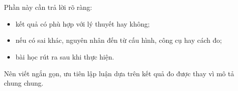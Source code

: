 \section{\sectiondiscussiontitle}
Phần này cần trả lời rõ ràng:
\begin{itemize}[leftmargin=2em]
    \item kết quả có phù hợp với lý thuyết hay không;
    \item nếu có sai khác, nguyên nhân đến từ cấu hình, công cụ hay cách đo;
    \item bài học rút ra sau khi thực hiện.
\end{itemize}

Nên viết ngắn gọn, ưu tiên lập luận dựa trên kết quả đo được thay vì mô tả chung chung.
